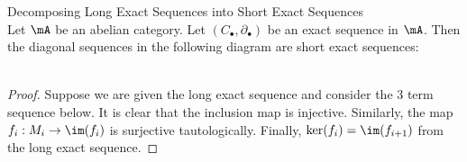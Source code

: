 \documentclass[a4paper]{article}
\begin{document}
\begin{prp}{Decomposing Long Exact Sequences into Short Exact Sequences}{}\\
Let $\mA$ be an abelian category. Let $(C_\bullet,\partial_\bullet)$ be an exact sequence in $\mA$. 
Then the diagonal sequences in the following diagram are short exact sequences: \\~\\
\begin{proof}
Suppose we are given the long exact sequence and consider the 3 term sequence below. It is clear that the inclusion map is injective. Similarly, the map $f_i:M_i\to\im(f_i)$ is surjective tautologically. Finally, $\ker(f_i)=\im(f_{i+1})$ from the long exact sequence. 
\end{proof}
\end{prp}
\end{document}
